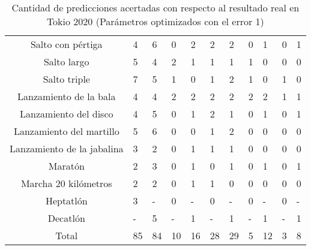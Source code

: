\begin{table}[H]
{\begin{tabular}{|c|P{1.3cm}|P{1.2cm}|P{1.3cm}|P{1.2cm}|P{1.4cm}|P{1.2cm}|P{1.45cm}|P{1.2cm}|P{1.3cm}|P{1.2cm}|}
            Salto con pértiga & 4 & 6 & 0 & 2 & 2 & 2 & 0 & 1 & 0 & 1 \\
            Salto largo & 5 & 4 & 2 & 1 & 1 & 1 & 1 & 0 & 0 & 0 \\
            Salto triple & 7 & 5 & 1 & 0 & 1 & 2 & 1 & 0 & 1 & 0 \\
            Lanzamiento de la bala & 4 & 4 & 2 & 2 & 2 & 2 & 2 & 2 & 1 & 1 \\
            Lanzamiento del disco & 4 & 5 & 0 & 1 & 2 & 1 & 0 & 1 & 0 & 1 \\
            Lanzamiento del martillo & 5 & 6 & 0 & 0 & 1 & 2 & 0 & 0 & 0 & 0 \\
            Lanzamiento de la jabalina & 3 & 2 & 0 & 1 & 1 & 1 & 0 & 0 & 0 & 0 \\
            Maratón & 2 & 3 & 0 & 1 & 0 & 1 & 0 & 1 & 0 & 1 \\
            Marcha 20 kilómetros & 2 & 2 & 0 & 1 & 1 & 0 & 0 & 0 & 0 & 0 \\
            Heptatlón & 3 & - & 0 & - & 0 & - & 0 & - & 0 & - \\
            Decatlón & - & 5 & - & 1 & - & 1 & - & 1 & - & 1 \\
            \hline
            Total & 85 & 84 & 10 & 16 & 28 & 29 & 5 & 12 & 3 & 8 \\ \hline
        \end{tabular}
        \caption{Cantidad de predicciones acertadas con respecto al resultado real en Tokio 2020 (Parámetros optimizados con el error 1)}
        \label{tab:error1tokio}
    }
\end{table}


